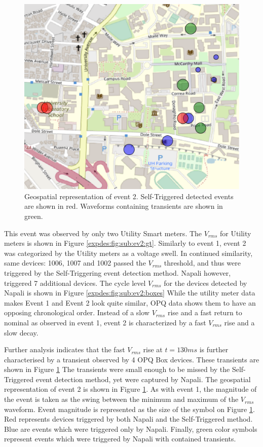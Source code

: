 \begin{figure}[!ht]
    \centering
    \includegraphics[width=0.7\linewidth]{img/napali_eval/subthreshold/ev2/map.pdf}
    \caption{Geospatial representation of event 2.
    Self-Triggered detected events are shown in red.
    Waveforms containing transients are shown in green.}
    \label{expdes:fig:sub:ev2:map}
\end{figure}

This event was observed by only two Utility Smart meters.
The $V_{rms}$ for Utility meters is shown in Figure \ref{expdes:fig:sub:ev2:gt}.
Similarly to event 1, event 2 was categorized by the Utility meters as a voltage swell.
In continued similarity, same devices: 1006, 1007 and 1002 passed the $V_{rms}$ threshold, and thus were triggered by the Self-Triggering event detection method.
Napali however, triggered 7 additional devices.
The cycle level $V_{rms}$ for the devices detected by Napali is shown in Figure \ref{expdes:fig:sub:ev2:boxes}
While the utility meter data makes Event 1 and Event 2 look quite similar, OPQ data shows them to have an opposing chronological order.
Instead of a slow $V_{rms}$ rise and a fast return to nominal as observed in event 1, event 2 is characterized by a fast $V_{rms}$ rise and a slow decay.

Further analysis indicates that the fast $V_{rms}$ rise at $t=130ms$ is further characterised by a transient observed by 4 OPQ Box devices.
These transients are shown in Figure \ref{expdes:fig:sub:ev2:map}
The transients were small enough to be missed by the Self-Triggered event detection method, yet were captured by Napali.
The geospatial representation of event 2 is shown in Figure \ref{expdes:fig:sub:ev2:map}.
As with event 1, the magnitude of the event is taken as the swing between the minimum and maximum of the $V_{rms}$ waveform.
Event magnitude is represented as the size of the symbol on Figure \ref{expdes:fig:sub:ev2:map}.
Red represents devices triggered by both Napali and the Self-Triggered method.
Blue are events which were triggered only by Napali.
Finally, green color symbols represent events which were triggered by Napali with contained transients.

